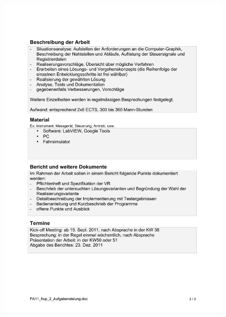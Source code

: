 \begin{figure}[h]
	\flushleft
	\includegraphics[width=\linewidth]{src/aufgabenstellung_seite2.pdf}
\end{figure}

